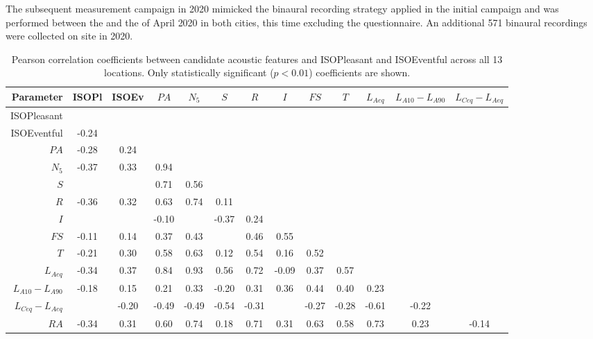    The subsequent measurement campaign in 2020 mimicked the binaural recording strategy applied in the initial campaign and was performed between the  and the  of April 2020 in both cities, this time excluding the questionnaire. An additional 571 binaural recordings were collected on site in 2020. 


\begin{table}
\centering
\caption{Pearson correlation coefficients between candidate acoustic features and ISOPleasant and ISOEventful across all 13 locations. Only statistically significant ($p < 0.01$) coefficients are shown. \label{tab:corr}}
\begin{tabular}{r|cccccccccccc} 
\toprule
\textbf{Parameter} & ISOPl & ISOEv & $PA$ & $N_5$ & $S$ & $R$ & $I$ & $FS$ & $T$ & $L_{Aeq}$ & $L_{A10}-L_{A90}$ & $L_{Ceq}-L_{Aeq}$ \\ 
\midrule
ISOPleasant &  &  &  &  &  &  &  &  &  &  &  &  \\
ISOEventful & -0.24 &  &  &  &  &  &  &  &  &  &  &  \\
$PA$ & -0.28 & 0.24 &  &  &  &  &  &  &  &  &  &  \\
$N_5$ & -0.37 & 0.33 & 0.94 &  &  &  &  &  &  &  &  &  \\
$S$ &  &  & 0.71 & 0.56 &  &  &  &  &  &  &  &  \\
$R$ & -0.36 & 0.32 & 0.63 & 0.74 & 0.11 &  &  &  &  &  &  &  \\
$I$ &  &  & -0.10 &  & -0.37 & 0.24 &  &  &  &  &  &  \\
$FS$ & -0.11 & 0.14 & 0.37 & 0.43 &  & 0.46 & 0.55 &  &  &  &  &  \\
$T$ & -0.21 & 0.30 & 0.58 & 0.63 & 0.12 & 0.54 & 0.16 & 0.52 &  &  &  &  \\
$L_{Aeq}$ & -0.34 & 0.37 & 0.84 & 0.93 & 0.56 & 0.72 & -0.09 & 0.37 & 0.57 &  &  &  \\
$L_{A10}-L_{A90}$ & -0.18 & 0.15 & 0.21 & 0.33 & -0.20 & 0.31 & 0.36 & 0.44 & 0.40 & 0.23 &  &  \\
$L_{Ceq}-L_{Aeq}$ &  & -0.20 & -0.49 & -0.49 & -0.54 & -0.31 &  & -0.27 & -0.28 & -0.61 & -0.22 &  \\
$RA$ & -0.34 & 0.31 & 0.60 & 0.74 & 0.18 & 0.71 & 0.31 & 0.63 & 0.58 & 0.73 & 0.23 & -0.14 \\
\bottomrule
\end{tabular}
\end{table}

